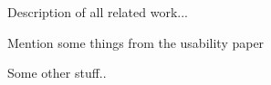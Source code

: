 
Description of all related work...

Mention some things from the usability paper\cite{summary:usability}

Some other stuff..